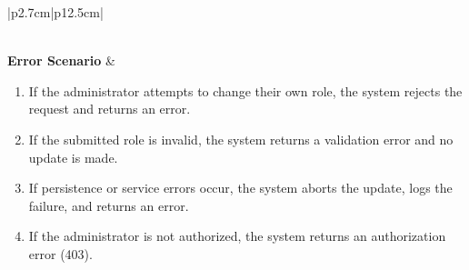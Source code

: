 \begin{table}[H]
\begin{tabular}{|p{2.7cm}|p{12.5cm}|}
\begin{minipage}[t]{\linewidth}
\begin{enumerate}[topsep=0pt,itemsep=1pt,parsep=0pt,partopsep=0pt]
                                      \end{enumerate}
                                  \end{minipage} \\ \hline
        \textbf{Error Scenario} & \begin{minipage}[t]{\linewidth}
                                      \begin{enumerate}[topsep=0pt,itemsep=1pt,parsep=0pt,partopsep=0pt]
                                          \item If the administrator attempts to change their own role, the system rejects the request and returns an error.
                                          \item If the submitted role is invalid, the system returns a validation error and no update is made.
                                          \item If persistence or service errors occur, the system aborts the update, logs the failure, and returns an error.
                                          \item If the administrator is not authorized, the system returns an authorization error (403).
                                      \end{enumerate}
                                  \end{minipage} \\ \hline
    \end{tabular}
    \label{tab:admin-change-user-role}
\end{table}


